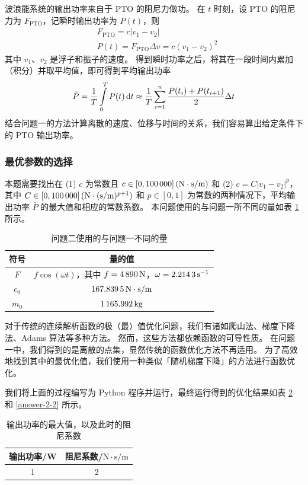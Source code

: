 波浪能系统的输出功率来自于 PTO 的阻尼力做功。
在 $t$ 时刻，设 PTO 的阻尼力为 $F_\text{PTO}$，记瞬时输出功率为 $P(t)$，则
    \begin{align}
        & F_\text{PTO}=c|v_1-v_2| \\
        & P(t)=F_\text{PTO}\Delta v=c(v_1-v_2)^2
    \end{align}
其中 $v_1$、$v_2$ 是浮子和振子的速度。
得到瞬时功率之后，将其在一段时间内累加（积分）并取平均值，即可得到平均输出功率
\begin{equation}
    \bar{P}=\dfrac{1}{T}\int\limits_0^TP(t)\mathop{}\!\mathrm{d} t\approx\dfrac{1}{T}\sum_{i=1}^n\dfrac{P(t_i)+P(t_{i+1})}{2}\Delta t
\end{equation}
结合问题一的方法计算离散的速度、位移与时间的关系，我们容易算出给定条件下的 PTO 输出功率。

\subsubsection{最优参数的选择}

本题需要找出在 (1) $c$ 为常数且 $c\in[0, \N{100000}]\,(\mathrm{N}\cdot\mathrm{s}/\mathrm{m})$ 和 (2) $c=C|v_1-v_2|^p$，其中 $C\in[0, \N{100000}]\,(\mathrm{N}\cdot(\mathrm{s}/\mathrm{m})^{p+1})$ 和 $p\in[0, 1]$ 为常数的两种情况下，平均输出功率 $\bar{P}$ 的最大值和相应的常数系数。
本问题使用的与问题一所不同的量如表 \ref{consts-2} 所示。
\begin{table}[htbp]
    \centering
    \begin{tabular}{cc}
        \toprule
        符号 & 量的值 \\
        \midrule
        $F$ & $f\cos(\omega t)$，其中 $f=\N{4890}\,\mathrm{N}$，$\omega=\N{2.2143}\,\mathrm{s}^{-1}$ \\
        $c_0$ & $\N{167.8395}\,\mathrm{N}\cdot\mathrm{s}/\mathrm{m}$ \\
        $m_0$ & $\N{1165.992}\,\mathrm{kg}$ \\
        \bottomrule
    \end{tabular}
    \caption{问题二使用的与问题一不同的量}
    \label{consts-2}
\end{table}

对于传统的连续解析函数的极（最）值优化问题，我们有诸如爬山法、梯度下降法、Adams 算法等多种方法。
然而，这些方法都依赖函数的可导性质。
在问题一中，我们得到的是离散的点集，显然传统的函数优化方法不再适用。
为了高效地找到其中的最优化值，我们使用一种类似「随机梯度下降」的方法进行函数优化。


我们将上面的过程编写为 Python 程序并运行，最终运行得到的优化结果如表 \ref{answer-2-1} 和 \ref{answer-2-2} 所示。
\begin{table}[htbp]
    \centering
    \begin{tabular}{cc}
        \toprule
        输出功率/W & 阻尼系数/$\mathrm{N}\cdot\mathrm{s}/\mathrm{m}$ \\
        \midrule
        1 & 2 \\
        \bottomrule
    \end{tabular}
    \caption{输出功率的最大值，以及此时的阻尼系数}
    \label{answer-2-1}
\end{table}

